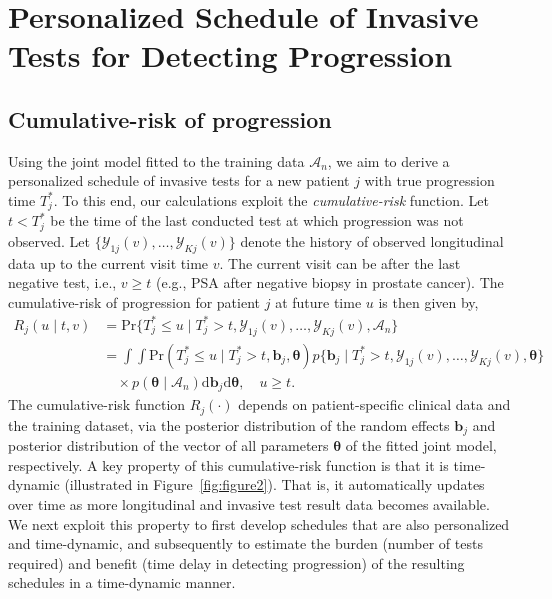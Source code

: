 \documentclass[AMA,STIX1COL]{WileyNJD-v2}
\begin{document}
\section{Personalized Schedule of Invasive Tests for Detecting Progression} 
\label{sec:schedule}

\subsection{Cumulative-risk of progression} 
\label{subsec:cum_risk}
Using the joint model fitted to the training data $\mathcal{A}_n$, we aim to derive a personalized schedule of invasive tests for a new patient $j$ with true progression time $T^*_j$. To this end, our calculations exploit the \emph{cumulative-risk} function. Let $t<T^*_j$ be the time of the last conducted test at which progression was not observed. Let $\{\mathcal{Y}_{1j}(v), \ldots, \mathcal{Y}_{Kj}(v)\}$ denote the history of observed longitudinal data up to the current visit time $v$. The current visit can be after the last negative test, i.e., $v \geq t$ (e.g., PSA after negative biopsy in prostate cancer). The cumulative-risk of progression for patient $j$ at future time $u$ is then given by,
\begin{equation}
\label{eq:cumulative_risk}
\begin{split}
R_j(u \mid t, v) &= \mbox{Pr}\big\{T^*_j \leq u \mid T^*_j > t, \mathcal{Y}_{1j}(v), \ldots, \mathcal{Y}_{Kj}(v), \mathcal{A}_n\big\}\\
&=\int \int \mbox{Pr}(T^*_j \leq u \mid T^*_j > t, \boldsymbol{b}_{j}, \boldsymbol{\theta}) p\big\{\boldsymbol{b}_j \mid T^*_j > t, \mathcal{Y}_{1j}(v), \ldots, \mathcal{Y}_{Kj}(v), \boldsymbol{\theta} \big\}\\
&\quad \times p(\boldsymbol{\theta} \mid \mathcal{A}_n) \mathrm{d}\boldsymbol{b}_j \mathrm{d}\boldsymbol{\theta}, \quad u \geq t.
\end{split}
\end{equation}
The cumulative-risk function $R_j(\cdot)$ depends on patient-specific clinical data and the training dataset, via the posterior distribution of the random effects $\boldsymbol{b}_{j}$ and posterior distribution of the vector of all parameters $\boldsymbol{\theta}$ of the fitted joint model, respectively. A key property of this cumulative-risk function is that it is time-dynamic (illustrated in Figure~\ref{fig:figure2}). That is, it automatically updates over time as more longitudinal and invasive test result data becomes available. We next exploit this property to first develop schedules that are also personalized and time-dynamic, and subsequently to estimate the burden (number of tests required) and benefit (time delay in detecting progression) of the resulting schedules in a time-dynamic manner.
\end{document}
